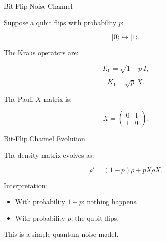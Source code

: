 \documentclass{beamer}
\begin{document}
\begin{frame}{Bit-Flip Noise Channel}

Suppose a qubit flips with probability \(p\):

\[
|0\rangle \leftrightarrow |1\rangle.
\]

\vspace{0.4cm}

The Kraus operators are:

\[
K_0
=
\sqrt{1-p}\, I,
\]

\[
K_1
=
\sqrt{p}\, X.
\]

\vspace{0.3cm}

The Pauli \(X\)-matrix is:

\[
X=
\begin{pmatrix}
0 & 1 \\
1 & 0
\end{pmatrix}.
\]

\end{frame}

\begin{frame}{Bit-Flip Channel Evolution}

The density matrix evolves as:

\[
\rho'
=
(1-p)\rho
+
p X \rho X.
\]

\vspace{0.4cm}

Interpretation:

\begin{itemize}
    \item With probability \(1-p\):
    nothing happens.
    
    \item With probability \(p\):
    the qubit flips.
\end{itemize}

\vspace{0.4cm}

This is a simple quantum noise model.

\end{frame}
\end{document}
